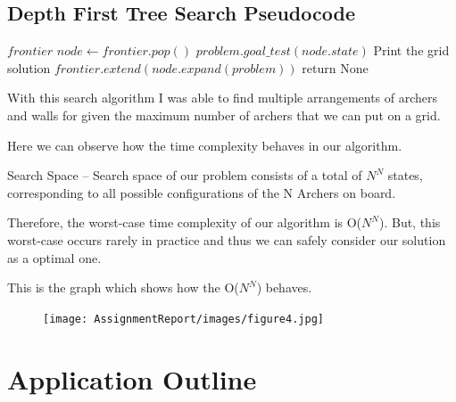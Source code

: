 \documentclass{article}
\begin{document}
\subsection{Depth First Tree Search Pseudocode}
\Large
\begin{codebox}

\li
\While $frontier$\Do\li
  $node \gets frontier.pop()$\li
 \If $problem.goal\_test(node.state) $      \Then \li Print the grid solution \End
 \li $frontier.extend(node.expand(problem))$
\End \End 
\li return None



\end{codebox}
 \vspace*{1cm}
\par With this search algorithm I was able to find multiple arrangements of archers and walls for given the maximum number of archers that we can put on a grid.
\newpage

\newpage
\par Here we can observe how the time complexity behaves in our algorithm.
\par Search Space –  Search space of our problem consists of a total of  $N^{N}$ states, corresponding to all possible configurations of the N Archers on board.
\par Therefore, the worst-case time complexity of our algorithm is O($N^{N}$). But, this worst-case occurs rarely in practice and thus we can safely consider our solution as a optimal one.\vspace*{1cm}
\par This is the graph which shows how the O($N^{N}$) behaves.
\begin{figure}[h]
\texttt{[image: AssignmentReport/images/figure4.jpg]}
\end{figure}

\newpage
\section{Application Outline}
\end{document}
